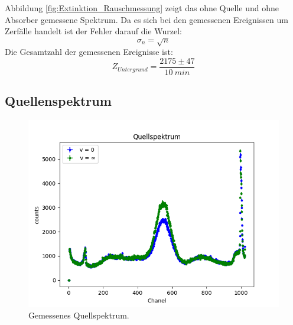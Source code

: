 \documentclass[12pt,a4paper]{article}
\begin{document}
Abbildung \ref{fig:Extinktion_Rauschmessung} zeigt das ohne Quelle und ohne Absorber gemessene Spektrum. Da es sich bei den gemessenen Ereignissen um Zerfälle handelt ist der Fehler darauf die Wurzel:
\begin{equation*}
\sigma _{n} = \sqrt{n}
\end{equation*}
Die Gesamtzahl der gemessenen Ereignisse ist:
\begin{equation*}
Z_{Untergrund} = \dfrac{2175 \pm 47}{\SI{10}{min}}
\end{equation*}

\subsection{Quellenspektrum}
\begin{figure}
\centering
\includegraphics[scale=0.8]{Bilder/Quellspektrum/v0_und_vinf.png}
\caption{Gemessenes Quellspektrum.}
\label{fig:Quellspektrum}
\end{figure}
\end{document}
